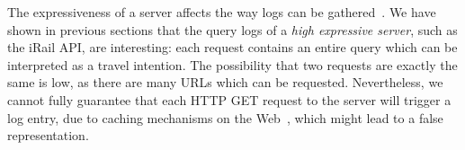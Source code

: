 \documentclass{sig-alternate}
\begin{document}






%

The expressiveness of a server affects the way logs can be gathered~\cite{usewod2015}.
We have shown in previous sections that the query logs of a \emph{high expressive server}, such as the iRail API, are interesting: each request contains an entire query which can be interpreted as a travel intention.
The possibility that two requests are exactly the same is low, as there are many URLs which can be requested.
Nevertheless, we cannot fully guarantee that each HTTP GET request to the server will trigger a log entry, due to caching mechanisms on the Web~\cite{fielding}, which might lead to a false representation.
\end{document}
